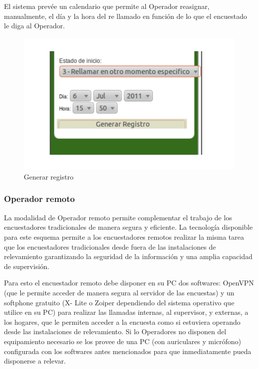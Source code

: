 \documentclass[
  openany]{book}
\begin{document}
El sistema prevée un calendario que permite al Operador reasignar, manualmente, el día y la hora del re llamado en función de lo que el encuestado le diga al Operador.

\begin{figure}

{\centering \includegraphics[width=1\linewidth]{imagenes/figura6-19} 

}

\caption{Generar registro}\label{fig:Gen}
\end{figure}

\hypertarget{operador-remoto}{%
\subsubsection{Operador remoto}\label{operador-remoto}}

La modalidad de Operador remoto permite complementar el trabajo de los encuestadores tradicionales de manera segura y eficiente. La tecnología disponible para este esquema permite a los encuestadores remotos realizar la misma tarea que los encuestadores tradicionales desde fuera de las instalaciones de relevamiento garantizando la seguridad de la información y una amplia capacidad de supervisión.

Para esto el encuestador remoto debe disponer en su PC dos softwares: OpenVPN (que le permite acceder de manera segura al servidor de las encuestas) y un softphone gratuito (X- Lite o Zoiper dependiendo del sistema operativo que utilice en su PC) para realizar las llamadas internas, al supervisor, y externas, a los hogares, que le permiten acceder a la encuesta como si estuviera operando desde las instalaciones de relevamiento. Si lo Operadores no disponen del equipamiento necesario se los provee de una PC (con auriculares y micrófono) configurada con los softwares antes mencionados para que inmediatamente pueda disponerse a relevar.
\end{document}
